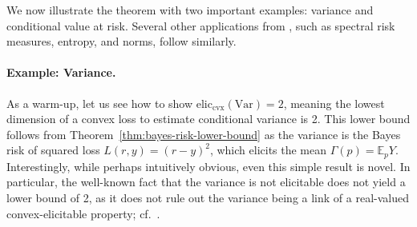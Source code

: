 \documentclass[anon,12pt]{colt2021} %
\newcommand{\reals}{\mathbb{R}}
\newcommand{\prop}[2][\mathcal{P}]{\mathrm{prop}_{#1}[#2]}
\newcommand{\eliccvx}{\mathrm{elic}_\mathrm{cvx}}
\newcommand{\affhull}{\mathrm{affhull}}
\newcommand{\E}{\mathbb{E}}
\newcommand{\Y}{\mathcal{Y}}
\newcommand{\lbar}{\underline{L}} %
\newcommand{\Var}{\mathrm{Var}}
\begin{document}

We now illustrate the theorem with two important examples: variance and conditional value at risk.
Several other applications from \citet{frongillo2020elicitation}, such as spectral risk measures, entropy, and norms, follow similarly.

\paragraph{Example: Variance.}
As a warm-up, let us see how to show $\eliccvx(\Var)=2$, meaning the lowest dimension of a convex loss to estimate conditional variance is 2. %
This lower bound follows from Theorem~\ref{thm:bayes-risk-lower-bound} as the variance is the Bayes risk of squared loss $L(r,y) = (r-y)^2$, which elicits the mean $\Gamma(p) = \E_p Y$.
Interestingly, while perhaps intuitively obvious, even this simple result is novel.
In particular, the well-known fact that the variance is not elicitable does not yield a lower bound of 2, as it does not rule out the variance being a link of a real-valued convex-elicitable property; cf.~\citet[Remark 1]{frongillo2020elicitation}.
\end{document}

